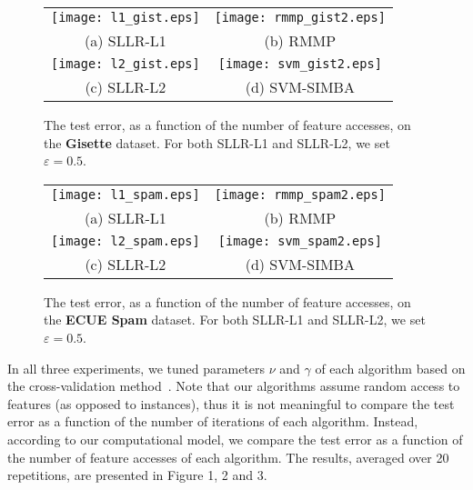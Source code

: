 \documentclass{llncs}
\begin{document}
\begin{figure}[tb] \label{fig:02}
    \begin{tabular}{cc}
\hspace{-0.3cm}   \texttt{[image: l1\_gist.eps]}
&\hspace{-0.6cm}\texttt{[image: rmmp\_gist2.eps]} \\
(a) SLLR-L1 & (b) RMMP \\
\hspace{-0.3cm}	\texttt{[image: l2\_gist.eps]}
&\hspace{-0.6cm}\texttt{[image: svm\_gist2.eps]} \\
	(c)  SLLR-L2 & (d)  SVM-SIMBA \\
	\end{tabular}
\caption{The test error, as a function of the number of feature accesses, on the \textbf{Gisette} dataset. For both SLLR-L1 and SLLR-L2, we set $\varepsilon=0.5$.}
\end{figure}
	
\begin{figure}[tb] \label{fig:03}
    \begin{tabular}{cc}
\hspace{-0.3cm}	\texttt{[image: l1\_spam.eps]}
&\hspace{-0.6cm}\texttt{[image: rmmp\_spam2.eps]} \\
(a) SLLR-L1 & (b) RMMP \\
\hspace{-0.3cm}	\texttt{[image: l2\_spam.eps]}
&\hspace{-0.6cm}\texttt{[image: svm\_spam2.eps]} \\
	(c)  SLLR-L2 & (d)  SVM-SIMBA \\
	\end{tabular}
\caption{The test error, as a function of the number of feature accesses, on the \textbf{ECUE Spam} dataset. For both SLLR-L1 and SLLR-L2, we set $\varepsilon=0.5$.}
\end{figure}
	
In all three experiments, we tuned parameters $\nu$ and $\gamma$ of each algorithm based on the cross-validation method~\cite{kohavi1995study}.
Note that our algorithms assume random access to features (as opposed to instances), thus it is not meaningful to compare the test error as a function of the number of iterations of each algorithm. Instead, according to our computational model, we compare the test error as a function of the number of feature accesses of each algorithm.
The results, averaged over 20 repetitions, are presented in Figure 1, 2 and 3.
	
\end{document}
